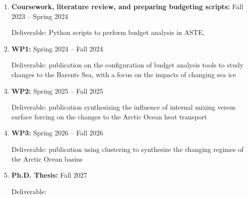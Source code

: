 \documentclass[a4paper,12pt]{article}
\begin{document}
    \begin{enumerate}
        \item \textbf{Coursework, literature review, and preparing budgeting scripts:} Fall 2023 -- Spring 2024

        Deliverable: Python scripts to perform budget analysis in ASTE, 
        
        \item \textbf{WP1:} Spring 2024 -- Fall 2024
        
        Deliverable: publication on the configuration of budget analysis tools to study changes to the Barents Sea, with a focus on the impacts of changing sea ice
        
        \item \textbf{WP2:} Spring 2025 -- Fall 2025

        Deliverable: publication synthesizing the influence of internal mixing versus surface forcing on the changes to the Arctic Ocean heat transport 

        \item \textbf{WP3:} Spring 2026 -- Fall 2026

        Deliverable: publication using clustering to synthesize the changing regimes of the Arctic Ocean basins

        \item \textbf{Ph.D. Thesis:} Fall 2027

        Deliverable: 
    \end{enumerate}
    

 		
    
\end{document}
